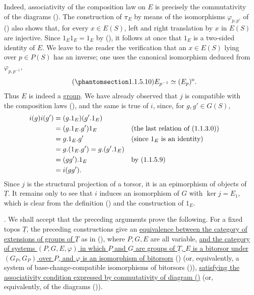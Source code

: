 Indeed, associativity of the composition law on $E$ is precisely the
commutativity of the diagrams (). The construction of $\pi_E$ by
means of the isomorphisms $\varphi_{p,p'}$ of () also shows that,
for every $x\in E(S)$, left and right translation by $x$ in $E(S)$ are
injective. Since $1_E1_E=1_E$ by (), it follows at once that
$1_E$ is a two-sided identity of $E$. We leave to the reader the
verification that an $x\in E(S)$ lying over $p\in P(S)$ has an inverse;
one uses the canonical isomorphism deduced from $\varphi_{p,p^{-1}}$,
\begin{equation}\tag{\SGARefTarget{sga7.sga7i.evii.n1-1-5-10}{1.1.5.10}}
 E_{p^{-1}}\simeq(E_p)^{\mathrm o}.
\end{equation}
Thus $E$ is indeed a \underline{group}. We have already observed that
$j$ is compatible with the composition laws (), and the same is
true of $i$, since, for $g,g'\in G(S)$,
\begin{align*}
 i(g)i(g')
 &= (g.1_E)(g'.1_E)\\
 &= (g.1_E.g')1_E &&\text{(the last relation of (\SGARefLink{sga7.sga7i.evii.n1-1-3-0}{1.1.3.0}))}\\
 &= g.1_E.g' &&\text{(since $1_E$ is an identity)}\\
 &= g.(1_E.g')=g.(g'.1_E)\\
 &= (gg').1_E &&\text{by (\SGARefLink{sga7.sga7i.evii.n1-1-5-9}{1.1.5.9})}\\
 &= i(gg').
\end{align*}
Since $j$ is the structural projection of a torsor, it is an
epimorphism of objects of $\underline T$. It remains only to see that
$i$ induces an isomorphism of $G$ with $\ker j=E_1$, which is clear from
the definition () and the construction of $1_E$.


. We shall accept that the preceding arguments prove the following.
For a fixed topos $\underline T$, the preceding constructions give an
\underline{equivalence between the category of extensions of groups of
$\underline T$} as in (), where $P,G,E$ are all variable,
\underline{and the category of systems $(P,G,E,\varphi)$ in which $P$
and $G$ are groups of $\underline T$, $E$ is a bitorsor under
$(G_P,G_P)$ over $P$, and $\varphi$ is an isomorphism of bitorsors}
() (or, equivalently, a system of base-change-compatible
isomorphisms of bitorsors ()), \underline{satisfying the
associativity condition expressed by commutativity of diagram ()}
(or, equivalently, of the diagrams ()).

